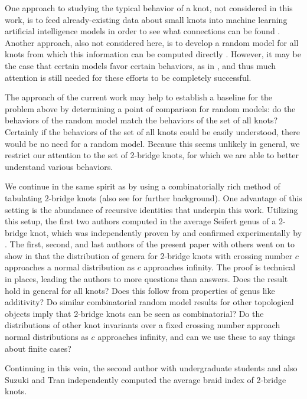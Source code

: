 \documentclass[12pt]{amsart}
\theoremstyle{definition}
\theoremstyle{remark}
\numberwithin{equation}{section}
\begin{document}
One approach to  studying the typical behavior of a knot, not considered in this work, is to feed already-existing data about small knots into machine learning artificial intelligence models in order to see what connections can be found \cite{Hug:ml,machinelearning, LevHajSaz}.  Another approach, also not considered here, is to develop a random model for all knots from which this information can be computed directly \cite{EZHLN, EZ:survey, OwaTsv}.  However, it may be the case that certain models favor certain behaviors, as in \cite{McC}, and thus much attention is still needed for these efforts to be completely successful.

The approach of the current work may help to establish a baseline for the problem above by determining a point of comparison for random models:  do the behaviors of the random model match the behaviors of the set of all knots?  Certainly if the behaviors of the set of all knots could be easily understood, there would be no need for a random model.  Because this seems unlikely in general, we restrict our attention to the set of 2-bridge knots, for which we are able to better understand various behaviors.

We continue in the same spirit as \cite{Coh:lower, CohLow,CohLowURSI} by using a combinatorially rich method of tabulating $2$-bridge knots (also see \cite{Co:3-bridge, CoKr, CoEZKr} for further background).  One advantage of this setting is the abundance of recursive identities that underpin this work. Utilizing this setup, the first two authors computed in \cite{CohLow} the average Seifert genus of a 2-bridge knot, which was independently proven by \cite{SuzTra:genus} and confirmed experimentally by \cite{RayDiao}.  The first, second, and last authors of the present paper with others went on to show in \cite{CohLowURSI} that the distribution of genera for 2-bridge knots with crossing number $c$ approaches a normal distribution as $c$ approaches infinity.  The proof is technical in places, leading the authors to more questions than answers.  Does the result hold in general for all knots?  Does this follow from properties of genus like additivity?  
Do similar combinatorial random model results for other topological objects imply that 2-bridge knots can be seen as combinatorial? Do the distributions of other knot invariants over a fixed crossing number approach normal distributions as $c$ approaches infinity, and can we use these to say things about finite cases? 

Continuing in this vein, the second author with undergraduate students \cite{LowURSI:braids} and also Suzuki and Tran \cite{SuzTra:braids} independently computed the average braid index of 2-bridge knots.
\end{document}
